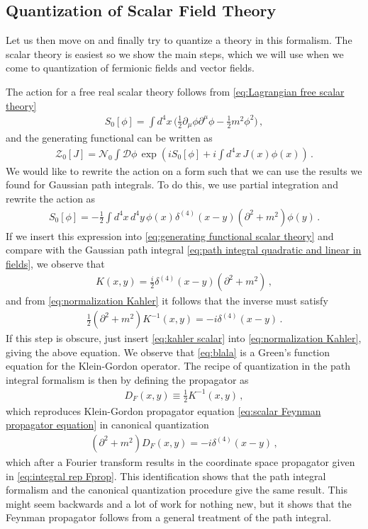 \subsection{Quantization of Scalar Field Theory}
Let us then move on and finally try to quantize a theory in this formalism. The scalar theory is easiest so we show the main steps, which we will use when we come to quantization of fermionic fields and vector fields.

The action for a free real scalar theory follows from \cref{eq:Lagrangian free scalar theory}
\begin{align}
    S_{0}[\phi]=\int d^{4}x\,\Big(\frac{1}{2}\partial_{\mu}\phi\partial^{\mu}\phi-\frac{1}{2}m^{2}\phi^{2}\Big)\,,
\end{align}
and the generating functional can be written as
\begin{align}\label{eq:generating functional scalar theory}
    \mathcal{Z}_{0}[J]=\mathcal{N}_{0}\int\mathcal{D}\phi\,\exp(iS_{0}[\phi]+i\int d^{4}x\,J(x)\phi(x))\,.
\end{align}
We would like to rewrite the action on a form such that we can use the results we found for Gaussian path integrals. To do this, we use partial integration and rewrite the action as
\begin{align}\label{eq:rewritten scalar A}
    S_{0}[\phi]=-\frac{1}{2}\int d^{4}x\,d^{4}y\,\phi(x)\delta^{(4)}(x-y)(\partial^{2}+m^{2})\phi(y)\,.
\end{align}
If we insert this expression into \cref{eq:generating functional scalar theory} and compare with the Gaussian path integral \cref{eq:path integral quadratic and linear in fields}, we observe that
\begin{align}\label{eq:kahler scalar}
    K(x,y)=\frac{i}{2}\delta^{(4)}(x-y)(\partial^{2}+m^{2})\,,
\end{align}
and from \cref{eq:normalization Kahler} it follows that the inverse must satisfy
\begin{align}\label{eq:blala}
    \frac{1}{2}(\partial^{2}+m^{2})K^{-1}(x,y)=-i\delta^{(4)}(x-y)\,.
\end{align}
If this step is obscure, just insert \cref{eq:kahler scalar} into \cref{eq:normalization Kahler}, giving the above equation. We observe that \cref{eq:blala} is a Green's function equation for the Klein-Gordon operator. The recipe of quantization in the path integral formalism is then by defining the propagator as
\begin{align}\label{eq:Feynman propagator identity}
    D_{F}(x,y)\equiv\frac{1}{2}K^{-1}(x,y)\,,
\end{align}
which reproduces Klein-Gordon propagator equation \cref{eq:scalar Feynman propagator equation} in canonical quantization
\begin{align}
    (\partial^{2}+m^{2})D_{F}(x,y)=-i\delta^{(4)}(x-y)\,,
\end{align}
which after a Fourier transform results in the coordinate space propagator given in \cref{eq:integral rep Fprop}. This identification shows that the path integral formalism and the canonical quantization procedure give the same result. This might seem backwards and a lot of work for nothing new, but it shows that the Feynman propagator follows from a general treatment of the path integral.

